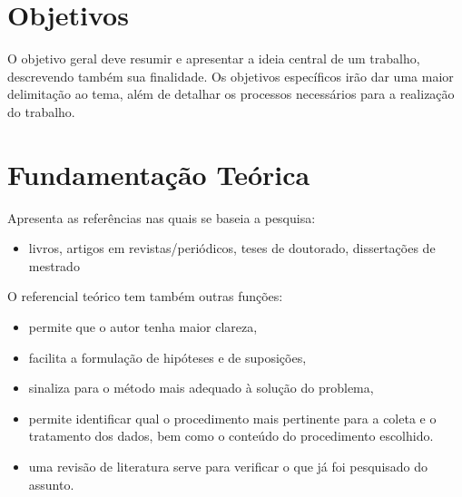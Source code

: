 \documentclass[a0,portrait]{a0poster}
\begin{document}
\begin{multicols}{2}


\section*{Objetivos}
\vspace{-1cm}
O objetivo geral deve resumir e apresentar a ideia central de um trabalho, descrevendo tamb\'em sua finalidade. Os objetivos espec\'i­ficos ir\~ao dar uma maior delimita\c c\~ao ao tema, al\'em de detalhar os processos necess\'arios para a realiza\c c\~ao do trabalho.




\section*{Fundamenta\c c\~ao Te\'orica}
\vspace{-1cm}
Apresenta as refer\^encias nas quais se baseia a pesquisa:\\
\begin{itemize}
\item livros, artigos em revistas/peri\'odicos, teses de doutorado, disserta\c c\~oes de mestrado
\end{itemize}
O referencial te\'orico tem tamb\'em outras fun\c c\~oes:
\begin{itemize}
\item permite que o autor tenha maior clareza,
\item facilita a formula\c c\~ao de hip\'oteses e de suposi\c c\~oes,
\item sinaliza para o m\'etodo mais adequado \`a  solu\c c\~ao do problema,
\item permite identificar qual o procedimento mais pertinente para a coleta e o tratamento dos dados, bem como o conte\'udo do procedimento escolhido.
\item uma revis\~ao de literatura serve para verificar o que j\'a foi pesquisado do assunto. 


\end{itemize}
\end{multicols}
\end{document}
